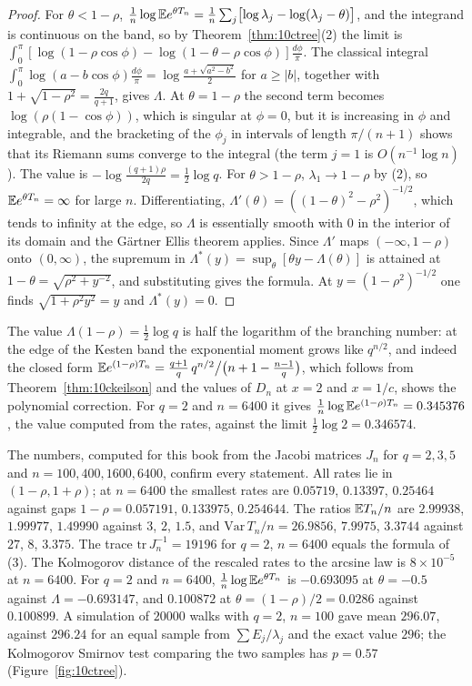 \begin{proof}
For $\theta<1-\rho$, $\frac1n\log\mathbb{E} e^{\theta T_n}=\frac1n\sum_j\bigl[\log\lambda_j-\log(\lambda_j-\theta)\bigr]$, and the integrand is continuous on the band, so by Theorem~\ref{thm:10ctree}(2) the limit is $\int_0^\pi[\log(1-\rho\cos\phi)-\log(1-\theta-\rho\cos\phi)]\frac{d\phi}{\pi}$. The classical integral $\int_0^\pi\log(a-b\cos\phi)\frac{d\phi}\pi=\log\frac{a+\sqrt{a^2-b^2}}{2}$ for $a\ge|b|$, together with $1+\sqrt{1-\rho^2}=\frac{2q}{q+1}$, gives $\Lambda$. At $\theta=1-\rho$ the second term becomes $\log(\rho(1-\cos\phi))$, which is singular at $\phi=0$, but it is increasing in $\phi$ and integrable, and the bracketing of the $\phi_j$ in intervals of length $\pi/(n+1)$ shows that its Riemann sums converge to the integral (the term $j=1$ is $O(n^{-1}\log n)$). The value is $-\log\frac{(q+1)\rho}{2q}=\frac12\log q$. For $\theta>1-\rho$, $\lambda_1\to1-\rho$ by (2), so $\mathbb{E} e^{\theta T_n}=\infty$ for large $n$. Differentiating, $\Lambda'(\theta)=((1-\theta)^2-\rho^2)^{-1/2}$, which tends to infinity at the edge, so $\Lambda$ is essentially smooth with $0$ in the interior of its domain and the G\"artner Ellis theorem \cite{dembozeitouni1998} applies. Since $\Lambda'$ maps $(-\infty,1-\rho)$ onto $(0,\infty)$, the supremum in $\Lambda^*(y)=\sup_\theta[\theta y-\Lambda(\theta)]$ is attained at $1-\theta=\sqrt{\rho^2+y^{-2}}$, and substituting gives the formula. At $y=(1-\rho^2)^{-1/2}$ one finds $\sqrt{1+\rho^2y^2}=y$ and $\Lambda^*(y)=0$.
\end{proof}

The value $\Lambda(1-\rho)=\frac12\log q$ is half the logarithm of the branching number: at the edge of the Kesten band the exponential moment grows like $q^{n/2}$, and indeed the closed form $\mathbb{E} e^{(1-\rho)T_n}=\frac{q+1}{q}\,q^{n/2}\big/\bigl(n+1-\frac{n-1}{q}\bigr)$, which follows from Theorem~\ref{thm:10ckeilson} and the values of $D_n$ at $x=2$ and $x=1/c$, shows the polynomial correction. For $q=2$ and $n=6400$ it gives $\frac1n\log\mathbb{E} e^{(1-\rho)T_n}=0.345376$, the value computed from the rates, against the limit $\frac12\log2=0.346574$.

The numbers, computed for this book from the Jacobi matrices $J_n$ for $q=2,3,5$ and $n=100,400,1600,6400$, confirm every statement. All rates lie in $(1-\rho,1+\rho)$; at $n=6400$ the smallest rates are $0.05719$, $0.13397$, $0.25464$ against gaps $1-\rho=0.057191$, $0.133975$, $0.254644$. The ratios $\mathbb{E} T_n/n$ are $2.99938$, $1.99977$, $1.49990$ against $3$, $2$, $1.5$, and $\mathrm{Var}\,T_n/n=26.9856$, $7.9975$, $3.3744$ against $27$, $8$, $3.375$. The trace $\mathrm{tr}\,J_n^{-1}=19196$ for $q=2$, $n=6400$ equals the formula of (3). The Kolmogorov distance of the rescaled rates to the arcsine law is $8\times10^{-5}$ at $n=6400$. For $q=2$ and $n=6400$, $\frac1n\log\mathbb{E} e^{\theta T_n}$ is $-0.693095$ at $\theta=-0.5$ against $\Lambda=-0.693147$, and $0.100872$ at $\theta=(1-\rho)/2=0.0286$ against $0.100899$. A simulation of $20000$ walks with $q=2$, $n=100$ gave mean $296.07$, against $296.24$ for an equal sample from $\sum E_j/\lambda_j$ and the exact value $296$; the Kolmogorov Smirnov test comparing the two samples has $p=0.57$ (Figure~\ref{fig:10ctree}).

